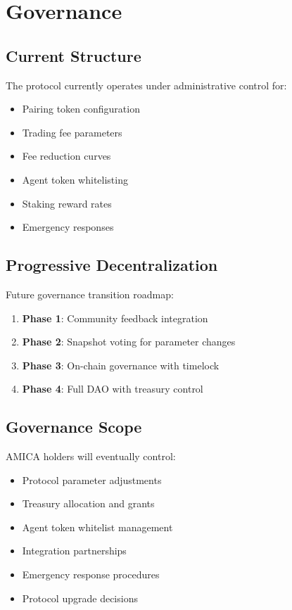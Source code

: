 \documentclass{article}
\begin{document}
\section{Governance}

\subsection{Current Structure}

The protocol currently operates under administrative control for:
\begin{itemize}
    \item Pairing token configuration
    \item Trading fee parameters
    \item Fee reduction curves
    \item Agent token whitelisting
    \item Staking reward rates
    \item Emergency responses
\end{itemize}

\subsection{Progressive Decentralization}

Future governance transition roadmap:

\begin{enumerate}
    \item \textbf{Phase 1}: Community feedback integration
    \item \textbf{Phase 2}: Snapshot voting for parameter changes
    \item \textbf{Phase 3}: On-chain governance with timelock
    \item \textbf{Phase 4}: Full DAO with treasury control
\end{enumerate}

\subsection{Governance Scope}

AMICA holders will eventually control:
\begin{itemize}
    \item Protocol parameter adjustments
    \item Treasury allocation and grants
    \item Agent token whitelist management
    \item Integration partnerships
    \item Emergency response procedures
    \item Protocol upgrade decisions
\end{itemize}
\end{document}
